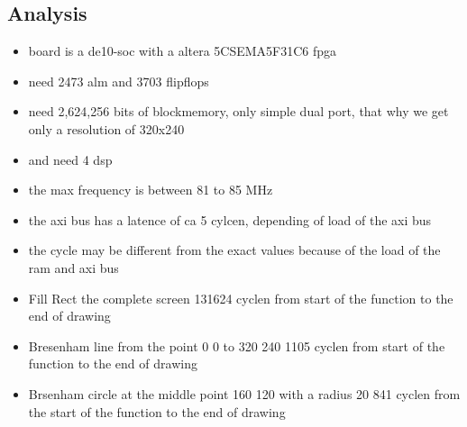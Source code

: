 \subsection{Analysis}
\begin{itemize}
	\item board is a de10-soc with a altera 5CSEMA5F31C6 fpga
	\item need 2473 alm and 3703 flipflops
	\item need 2,624,256 bits of blockmemory, only simple dual port, that why we get only a resolution of 320x240
	\item and need 4 dsp
	\item the max frequency is between 81 to 85 MHz
	\item the axi bus has a latence of ca 5 cylcen, depending of load of the axi bus
	\item the cycle may be different from the exact values because of the load of the ram and axi bus
	\item Fill Rect  the complete screen 131624 cyclen from start of the function to the end of drawing
	\item Bresenham line from the point 0 0 to 320 240 1105 cyclen from start of the function to the end of drawing
	\item Brsenham circle at the middle point 160 120 with a radius 20 841 cyclen from the start of the function to the end of drawing
\end{itemize}